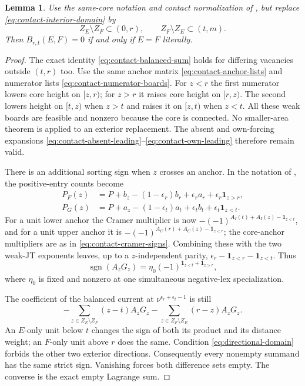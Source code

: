 \documentclass[11pt,a4paper]{amsart}
\numberwithin{equation}{section}
\theoremstyle{plain}
\newtheorem{lemma}[theorem]{Lemma}
\theoremstyle{definition}
\newcommand{\one}{\mathbf1}
\DeclareMathOperator{\sgn}{sgn}
\begin{document}
\begin{lemma}\label{lem:directional-contact}
Use the same-core notation and contact normalization of
, but replace \eqref{eq:contact-interior-domain} by
\begin{equation}\label{eq:directional-domain}
 Z_E\setminus Z_F\subset(0,r),\qquad
 Z_F\setminus Z_E\subset(t,m).
\end{equation}
Then \(B_{r,t}(E,F)=0\) if and only if \(E=F\) literally.
\end{lemma}
\begin{proof}
The exact identity \eqref{eq:contact-balanced-sum} holds for differing
vacancies outside \((t,r)\) too.  Use the same anchor matrix
\eqref{eq:contact-anchor-lists} and numerator lists
\eqref{eq:contact-numerator-boards}.  For \(z<r\) the first numerator lowers
core height on \([z,r)\); for \(z>r\) it raises core height on \([r,z)\).
The second lowers height on \([t,z)\) when \(z>t\) and raises it on \([z,t)\)
when \(z<t\).  All these weak boards are feasible and nonzero because the
core is connected.  No smaller-area theorem is applied to an exterior
replacement.  The absent and own-forcing expansions
\eqref{eq:contact-absent-leading}--\eqref{eq:contact-own-leading} therefore
remain valid.

There is an additional sorting sign when \(z\) crosses an anchor.  In the
notation of , the positive-entry counts become
\begin{align*}
 P_F(z)&=P+b_z-(1-\epsilon_r)b_r+\epsilon_ra_r
                  +\epsilon_r\one_{z>r},\\
 P_G(z)&=P+a_z-(1-\epsilon_t)a_t+\epsilon_tb_t
                  +\epsilon_t\one_{z<t}.
\end{align*}
For a unit lower anchor the Cramer multiplier is now
\(-(-1)^{A_I(t)+A_I(z)-\one_{z<t}}\), and for a unit upper anchor it is
\(-(-1)^{A_C(r)+A_C(z)-\one_{z<r}}\); the core-anchor multipliers are as in
\eqref{eq:contact-cramer-signs}.  Combining these with the two weak-JT
exponents leaves, up to a \(z\)-independent parity,
\(\epsilon_r-\one_{z<r}-\one_{z<t}\).  Thus
\[
 \sgn(A_zG_z)=\eta_0(-1)^{\one_{z<t}+\one_{z>r}},
\]
where \(\eta_0\) is fixed and nonzero at one simultaneous negative-lex
specialization.

The coefficient of the balanced current at
\(\nu^{\epsilon_r+\epsilon_t-1}\) is still
\[
 -\sum_{z\in Z_E\setminus Z_F}(z-t)A_zG_z
 -\sum_{z\in Z_F\setminus Z_E}(r-z)A_zG_z.
\]
An \(E\)-only unit below \(t\) changes the sign of both its product and its
distance weight; an \(F\)-only unit above \(r\) does the same.  Condition
\eqref{eq:directional-domain} forbids the other two exterior directions.
Consequently every nonempty summand has the same strict sign.  Vanishing
forces both difference sets empty.  The converse is the exact empty
Lagrange sum.
\end{proof}
\end{document}
